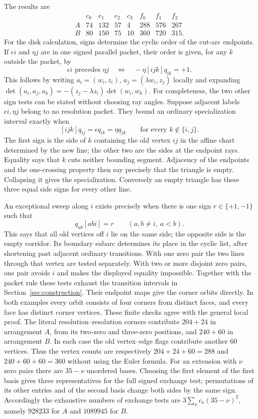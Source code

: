 \documentclass[11pt]{article}
\theoremstyle{definition}\newtheorem{definition}[theorem]{Definition}
\begin{document}
The results are
\[
\begin{array}{c|rrrr|rrr}
 &c_0&c_1&c_2&c_3&f_0&f_1&f_2\\\hline
 A&74&132&57&4&288&576&267\\
 B&80&150&75&10&360&720&315.
\end{array}
\]
For the disk calculation, signs determine the cyclic order of the
cut-arc endpoints. If $\epsilon i$ and $\eta j$ are in one signed
parallel packet, their order is given, for any $k$ outside the packet,
by
\[
 \epsilon i\text{ precedes }\eta j
 \quad\Longleftrightarrow\quad -\eta[ijk]q_{ik}=+1.
\]
This follows by writing $a_i=(w_i,z_i)$,
$a_j=(\lambda w_i,z_j)$ locally and expanding
$\det(a_i,a_j,a_k)=-(z_j-\lambda z_i)\det(w_i,w_k)$.
For completeness, the two other sign tests can be stated without
choosing ray angles. Suppose adjacent labels $\epsilon i,\eta j$
belong to no resolution packet. They bound an ordinary specialization
interval exactly when
\[
 [ijk]q_{ij}=\epsilon q_{ik}=\eta q_{jk}
 \qquad\text{for every }k\notin\{i,j\}.
\]
The first sign is the side of $k$ containing the old vertex $ij$ in
the affine chart determined by the new line; the other two are the
sides at the endpoint rays. Equality says that $k$ cuts neither
bounding segment. Adjacency of the endpoints and the one-crossing
property then say precisely that the triangle is empty. Collapsing
it gives the specialization. Conversely an empty triangle has these
three equal side signs for every other line.

An exceptional sweep along $i$ exists precisely when there is one
sign $r\in\{+1,-1\}$ such that
\[
 q_{ab}[abi]=r\qquad(a,b\ne i,\ a<b).
\]
This says that all old vertices off $i$ lie on the same side; the
opposite side is the empty corridor. Its boundary subarc determines
its place in the cyclic list, after shortening past adjacent
ordinary transitions. With one zero pair the two lines through that
vertex are tested separately. With two or more disjoint zero pairs,
one pair avoids $i$ and makes the displayed equality impossible.
Together with the packet rule these tests exhaust the transition
intervals in Section~\ref{sec:construction}. Their endpoint maps give
the corner orbits directly. In both examples every orbit consists of
four corners from distinct faces, and every face has distinct corner
vertices. These finite checks agree with the general local proof.
The literal resolution--resolution corners contribute $204+24$ in
arrangement $A$, from its two-zero and three-zero positions, and
$240+60$ in arrangement $B$. In each case the old vertex--edge flags
contribute another $60$ vertices. Thus the vertex counts are respectively
$204+24+60=288$ and $240+60+60=360$ without using the Euler formula.
For an extension with $\nu$ zero pairs there are $35-\nu$ unordered
bases. Choosing the first element of the first basis gives three
representatives for the full signed exchange test; permutations of
its other entries and of the second basis change both sides by
the same sign. Accordingly the exhaustive numbers of exchange tests
are $3\sum_\nu c_\nu(35-\nu)^2$, namely $928233$ for $A$ and
$1089945$ for $B$.
\end{document}
